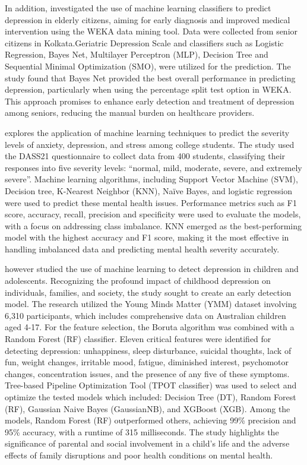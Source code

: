 In addition, \citet{sau2017predicting} investigated the use of machine learning classifiers to predict depression in elderly citizens, aiming for early diagnosis and improved medical intervention using the WEKA data mining tool.  Data were collected from senior citizens in Kolkata.Geriatric Depression Scale and classifiers such as Logistic Regression, Bayes Net, Multilayer Perceptron (MLP), Decision Tree and  Sequential Minimal Optimization (SMO), were utilized for the prediction. The study found that Bayes Net provided the best overall performance in predicting depression, particularly when using the percentage split test option in WEKA. This approach promises to enhance early detection and treatment of depression among seniors, reducing the manual burden on healthcare providers. 

\citet{malik2023anxiety} explores the application of machine learning techniques to predict the severity levels of anxiety, depression, and stress among college students. The study used the DASS21 questionnaire to collect data from 400 students, classifying their responses into five severity levels: “normal, mild, moderate, severe, and extremely severe”. Machine learning algorithms, including Support Vector Machine (SVM), Decision tree, K-Nearest Neighbor (KNN), Naïve Bayes, and logistic regression were used to predict these mental health issues. Performance metrics such as F1 score, accuracy, recall, precision and specificity were used to evaluate the models, with a focus on addressing class imbalance. KNN emerged as the best-performing model with the highest accuracy and F1 score, making it the most effective in handling imbalanced data and predicting mental health severity accurately.

 \citet{haque2021detection} however studied the use of machine learning to detect depression in children and adolescents. Recognizing the profound impact of childhood depression on individuals, families, and society, the study sought to create an early detection model. The research utilized the Young Minds Matter (YMM) dataset involving 6,310 participants, which includes comprehensive data on Australian children aged 4-17. For the feature selection, the Boruta algorithm was combined with a Random Forest (RF) classifier. Eleven critical features were identified for detecting depression: unhappiness, sleep disturbance, suicidal thoughts, lack of fun, weight changes, irritable mood, fatigue, diminished interest, psychomotor changes, concentration issues, and the presence of any five of these symptoms. Tree-based Pipeline Optimization Tool (TPOT classifier) was used to select and optimize the tested models which included: Decision Tree (DT), Random Forest (RF), Gaussian Naive Bayes (GaussianNB), and XGBoost (XGB).  Among the models, Random Forest (RF) outperformed others, achieving 99\% precision and 95\% accuracy, with a runtime of 315 milliseconds. The study highlights the significance of parental and social involvement in a child's life and the adverse effects of family disruptions and poor health conditions on mental health.

